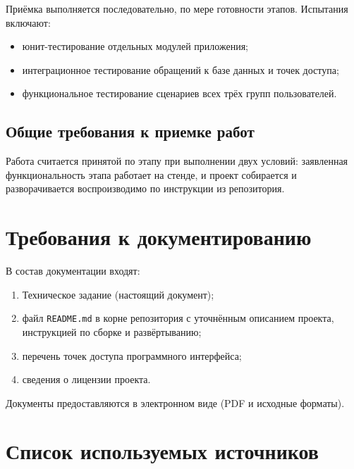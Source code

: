 \documentclass[14pt, a4paper]{extarticle}
\begin{document}
Приёмка выполняется последовательно, по мере готовности этапов. Испытания включают:

\begin{itemize}
	\item юнит-тестирование отдельных модулей приложения;
	\item интеграционное тестирование обращений к базе данных и точек доступа;
	\item функциональное тестирование сценариев всех трёх групп пользователей.
\end{itemize}

\subsection{Общие требования к приемке работ}

Работа считается принятой по этапу при выполнении двух условий: заявленная функциональность этапа работает на стенде, и проект собирается и разворачивается воспроизводимо по инструкции из репозитория.

\section{Требования к документированию}

В состав документации входят:

\begin{enumerate}
	\item Техническое задание (настоящий документ);
	\item файл \texttt{README.md} в корне репозитория с уточнённым описанием проекта, инструкцией по сборке и развёртыванию;
	\item перечень точек доступа программного интерфейса;
	\item сведения о лицензии проекта.
\end{enumerate}

Документы предоставляются в электронном виде (PDF и исходные форматы).

\section*{Список используемых источников}
\end{document}

